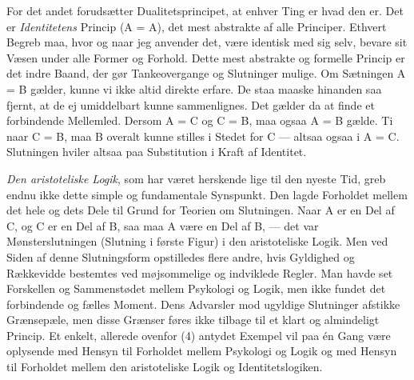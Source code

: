 \documentclass[12pt,a4paper,openany]{book}
\newcommand{\opage}[1]{\marginnote{\footnotesize\textit{[#1]}}}
\begin{document}
For det andet forudsætter Dualitetsprincipet, at enhver Ting er hvad den
er. Det er \emph{Identitetens} Princip (A = A), det mest abstrakte af
alle Principer. Ethvert Begreb maa, hvor og naar jeg anvender det, være
identisk med sig selv, bevare sit Væsen under alle Former og Forhold.
Dette mest abstrakte og formelle Princip er det indre Baand, der gør
Tankeovergange og Slutninger mulige. Om Sætningen A = B gælder, kunne vi
ikke altid direkte erfare. De staa maaske hinanden saa fjernt, at de ej
umiddelbart kunne sammenlignes. Det gælder da at finde et forbindende
Mellemled. Dersom A = C og C = B, maa ogsaa A = B gælde. Ti naar C = B,
maa B overalt kunne stilles i Stedet for C --- altsaa ogsaa i A = C.
Slutningen hviler altsaa paa Substitution i Kraft af Identitet.

\emph{Den aristoteliske Logik}, som har været herskende lige til den
nyeste Tid, greb endnu ikke dette simple og fundamentale Synspunkt. Den
lagde Forholdet mellem det hele og dets Dele til Grund for Teorien om
Slutningen. Naar A er en Del af C, og C er en Del af B, saa maa A være
en Del af B, --- det var Mønsterslutningen (Slutning i første Figur) i
den aristoteliske Logik. Men ved Siden af denne Slutningsform
opstilledes flere andre, hvis Gyldighed og
\opage{217}Rækkevidde bestemtes ved møjsommelige og indviklede Regler.
Man havde set Forskellen og Sammenstødet mellem Psykologi og Logik, men
ikke fundet det forbindende og fælles Moment. Dens Advarsler mod
ugyldige Slutninger afstikke Grænsepæle, men disse Grænser føres ikke
tilbage til et klart og almindeligt Princip. Et enkelt, allerede ovenfor
(4) antydet Exempel vil paa én Gang være oplysende med Hensyn til
Forholdet mellem Psykologi og Logik og med Hensyn til Forholdet mellem
den aristoteliske Logik og Identitetslogiken.
\end{document}
